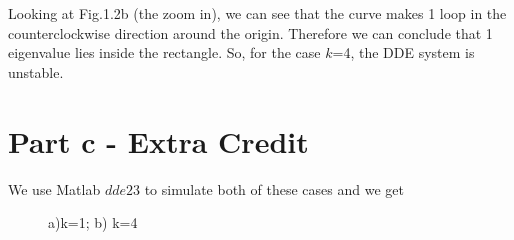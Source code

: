 Looking at Fig.1.2b (the zoom in), we can see that the curve makes 1 loop in the counterclockwise direction around the origin. Therefore we can conclude that 1 eigenvalue lies inside the rectangle. So, for the case $k$=4, the DDE system is unstable.

\section{Part c - Extra Credit}
We use Matlab $dde23$ to simulate both of these cases and we get
\begin{figure}[H]
	\caption{a)k=1; b) k=4}
\end{figure}

